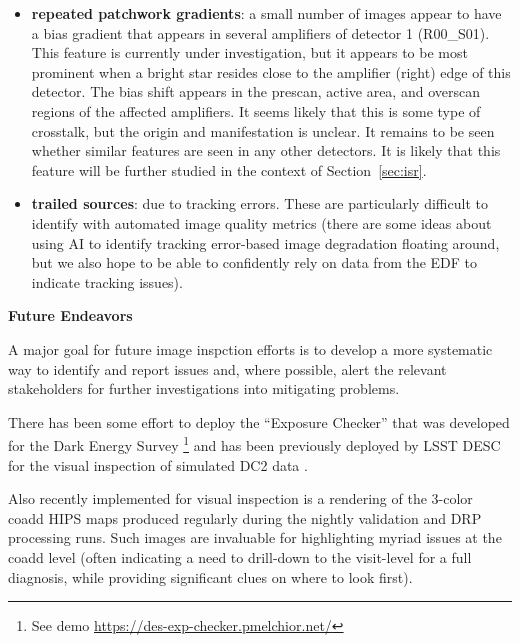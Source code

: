\begin{itemize}
\item \textbf{repeated patchwork gradients}: a small number of images appear to have a 
  bias gradient that appears in several amplifiers of detector 1 (R00\_S01). This feature 
  is currently under investigation, but it appears to be most prominent when a bright star 
  resides close to the amplifier (right) edge of this detector. The bias shift appears in 
  the prescan, active area, and overscan regions of the affected amplifiers. It seems 
  likely that this is some type of crosstalk, but the origin and manifestation is unclear. 
  It remains to be seen whether similar features are seen in any other detectors. It is 
  likely that this feature will be further studied in the context of Section~\ref{sec:isr}.

\item \textbf{trailed sources}: due to tracking errors.  These are particularly
  difficult to identify with automated image quality metrics (there are some ideas
  about using AI to identify tracking error-based image degradation floating around,
  but we also hope to be able to confidently rely on data from the EDF to indicate
  tracking issues).

\end{itemize}

\noindent \textbf{Future Endeavors}

A major goal for future image inspction efforts is to develop a more systematic
way to identify and report issues and, where possible, alert the
relevant stakeholders for further investigations into mitigating problems.

There has been some effort to deploy the ``Exposure Checker'' that was developed for the Dark Energy Survey \citep{2016A&C....16...99M}\footnote{See demo \url{https://des-exp-checker.pmelchior.net/}} and has been previously deployed by LSST DESC for the visual inspection of simulated DC2 data \citep{2021ApJS..253...31L}.

Also recently implemented for visual inspection is a rendering of the 3-color coadd
HIPS maps produced regularly during the nightly validation and DRP processing runs.
Such images are invaluable for highlighting myriad issues at the coadd level (often
indicating a need to drill-down to the visit-level for a full diagnosis, while
providing significant clues on where to look first).
